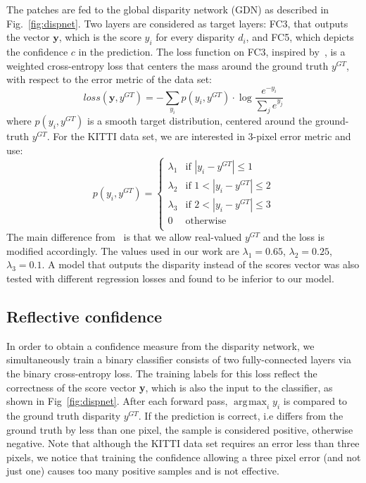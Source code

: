 \documentclass[10pt, twocolumn, letterpaper]{article}
\DeclareMathOperator*{\argmax}{arg\!\max}
\begin{document}
The patches are fed to the global disparity network (GDN) as described in Fig.~\ref{fig:dispnet}. Two layers are considered as target layers: FC3, that outputs the vector $\mathbf{y}$, which is the score $y_i$ for every disparity $d_i$, and FC5, which depicts the confidence $c$ in the prediction. The loss function on FC3, inspired by~\cite{efficient}, is a weighted cross-entropy loss that centers the mass around the ground truth $y^{GT}$, with respect to the error metric of the data set: 
\begin{equation}
loss(\mathbf{y}, y^{GT}) = -\sum_{y_i}{p(y_i, y^{GT})\cdot \log{\frac{e^{-y_i}}{\sum_j{e^{y_j}}}}}
\end{equation}
where $p(y_i, y^{GT})$ is a smooth target distribution, centered around the ground-truth $y^{GT}$. 
For the KITTI data set, we are interested in 3-pixel error metric and use:
\begin{equation}
p(y_i, y^{GT}) =
\left\{
	\begin{array}{ll}
		 \lambda_1  & \mbox{if } |y_i - y^{GT}| \leq 1 \\
		 \lambda_2  & \mbox{if } 1 < |y_i - y^{GT}| \leq 2 \\
         \lambda_3  & \mbox{if } 2 < |y_i - y^{GT}| \leq 3 \\
         0  & \text{otherwise} \\
	\end{array}
\right.
\end{equation}
The main difference from~\cite{efficient} is that we allow real-valued $y^{GT}$ and the loss is modified accordingly. The values used in our work are $\lambda_1 = 0.65$, $\lambda_2 = 0.25$, $\lambda_3 = 0.1$. A model that outputs the disparity instead of the scores vector was also tested with different regression losses and found to be inferior to our model.

\subsection{Reflective confidence}
\label{sec:reflective}

In order to obtain a confidence measure from the disparity network, we simultaneously train a binary classifier consists of two fully-connected layers via the binary cross-entropy loss. The training labels for this loss reflect the correctness of the score vector \textbf{y}, which is also the input to the classifier, as shown in Fig~\ref{fig:dispnet}. After each forward pass, $\argmax_i{y_i}$ is compared to the ground truth disparity $y^{GT}$. If the prediction is correct, i.e differs from the ground truth by less than one pixel, the sample is considered positive, otherwise negative. Note that although the KITTI data set requires an error less than three pixels, we notice that training the confidence allowing a three pixel error (and not just one) causes too many positive samples and is not effective. 
\end{document}
